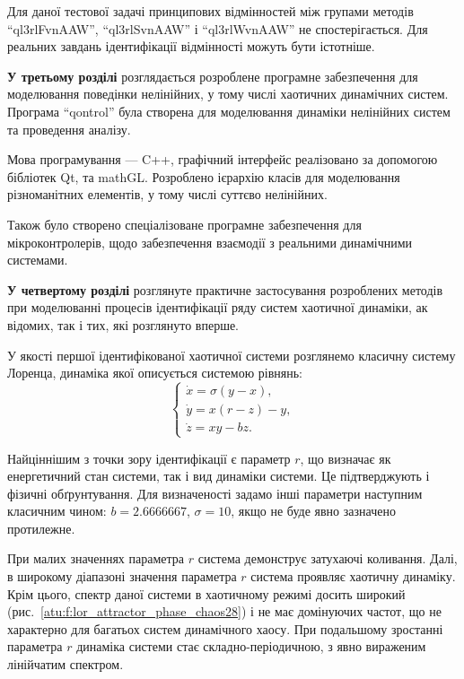 \documentclass[a4paper,13pt]{atuaref}
\begin{document}
Для даної тестової задачі принципових відмінностей між групами методів
``ql3rlFvnAAW'', ``ql3rlSvnAAW'' і ``ql3rlWvnAAW'' не спостерігається. Для
реальних завдань ідентифікації відмінності можуть бути істотніше.





\medskip
\textbf{У третьому розділі}
розглядається розроблене програмне
забезпечення
для моделювання
поведінки  нелінійних,
у тому числі хаотичних динамічних систем.
Програма ``qontrol'' була створена для моделювання динаміки
нелінійних систем та проведення аналізу.

Мова програмування --- C++,
графічний інтерфейс реалізовано за допомогою
бібліотек Qt, та mathGL.
Розроблено ієрархію класів для
моделювання різноманітних елементів,
у тому числі суттєво нелінійних.

Також було створено спеціалізоване
програмне забезпечення для мікроконтролерів,
щодо забезпечення взаємодії
з реальними динамічними системами.




\textbf{У четвертому розділі}
розглянуте практичне застосування розроблених методів при моделюванні
процесів ідентифікації ряду систем хаотичної динаміки,
ак відомих, так і тих, які розглянуто вперше.

У якості першої ідентифікованої хаотичної системи розглянемо класичну систему
Лоренца, динаміка якої описується системою рівнянь:
%
\begin{equation}
\begin{cases}
  \dot{x} = \sigma (y-x ) , \\
  \dot{y} = x (r-z) - y , \\
  \dot{z} = x y - b z .
\end{cases}
\label{atu:eq:lor}
\end{equation}

Найціннішим з точки зору ідентифікації є параметр $ r $, що визначає як
енергетичний стан системи, так і вид динаміки системи. Це підтверджують і
фізичні обґрунтування. Для визначеності задамо інші параметри наступним
класичним чином: $ b = 2.6666667 $, $\sigma = 10 $, якщо не буде явно
зазначено протилежне.

При малих значеннях параметра $ r $ система демонструє затухаючі коливання.
Далі, в широкому діапазоні значення параметра $r$ система проявляє хаотичну
динаміку. Крім цього, спектр даної системи в хаотичному режимі досить широкий
(рис.~\ref{atu:f:lor_attractor_phase_chaos28}) і не має домінуючих
частот, що не характерно для багатьох систем динамічного хаосу.
При подальшому зростанні параметра $ r $ динаміка системи стає
складно-періодичною, з явно вираженим лінійчатим спектром.
\end{document}
